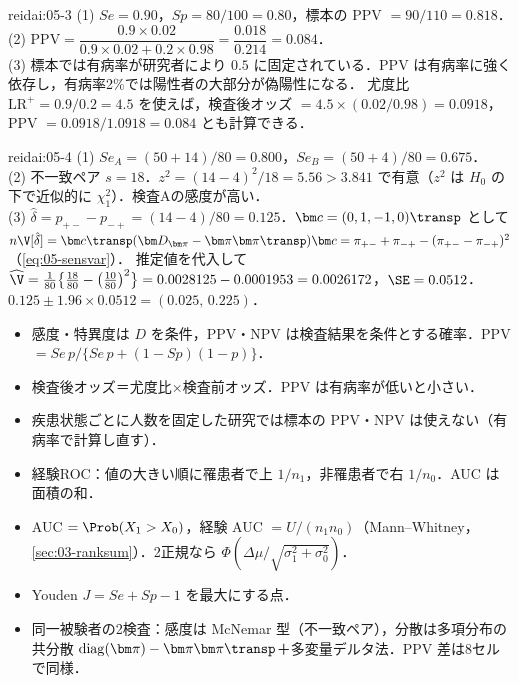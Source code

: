 \begin{kaitou}{reidai:05-3}
(1) $Se=0.90$，$Sp=80/100=0.80$，標本の PPV $=90/110=0.818$．\\
(2) $\mathrm{PPV}=\dfrac{0.9\times0.02}{0.9\times0.02+0.2\times0.98}=\dfrac{0.018}{0.214}=0.084$．\\
(3) 標本では有病率が研究者により $0.5$ に固定されている．PPV は有病率に強く依存し，有病率2\%では陽性者の大部分が偽陽性になる．
尤度比 $\mathrm{LR}^+=0.9/0.2=4.5$ を使えば，検査後オッズ $=4.5\times(0.02/0.98)=0.0918$，PPV $=0.0918/1.0918=0.084$ とも計算できる．
\end{kaitou}

\begin{kaitou}{reidai:05-4}
(1) $Se_A=(50+14)/80=0.800$，$Se_B=(50+4)/80=0.675$．\\
(2) 不一致ペア $s=18$．$z^2=(14-4)^2/18=5.56>3.841$ で有意（$z^2$ は $H_0$ の下で近似的に $\chi^2_1$）．検査Aの感度が高い．\\
(3) $\hat\delta=p_{+-}-p_{-+}=(14-4)/80=0.125$．$\bm c=(0,1,-1,0)\transp$ として
$n\V[\hat\delta]=\bm c\transp(\bm D_{\bm\pi}-\bm\pi\bm\pi\transp)\bm c=\pi_{+-}+\pi_{-+}-(\pi_{+-}-\pi_{-+})^2$（\cref{eq:05-sensvar}）．
推定値を代入して $\widehat\V=\frac{1}{80}\bigl\{\frac{18}{80}-\bigl(\frac{10}{80}\bigr)^2\bigr\}=0.0028125-0.0001953=0.0026172$，$\SE=0.0512$．
$0.125\pm1.96\times0.0512=(0.025,\,0.225)$．
\end{kaitou}

\begin{summarybox}
\begin{itemize}
\item 感度・特異度は $D$ を条件，PPV・NPV は検査結果を条件とする確率．PPV $=Se\,p/\{Se\,p+(1-Sp)(1-p)\}$．
\item 検査後オッズ＝尤度比×検査前オッズ．PPV は有病率が低いと小さい．
\item 疾患状態ごとに人数を固定した研究では標本の PPV・NPV は使えない（有病率で計算し直す）．
\item 経験ROC：値の大きい順に罹患者で上 $1/n_1$，非罹患者で右 $1/n_0$．AUC は面積の和．
\item AUC $=\Prob(X_1>X_0)$，経験 AUC $=U/(n_1n_0)$（Mann--Whitney，\cref{sec:03-ranksum}）．2正規なら $\Phi(\Delta\mu/\sqrt{\sigma_1^2+\sigma_0^2})$．
\item Youden $J=Se+Sp-1$ を最大にする点．
\item 同一被験者の2検査：感度は McNemar 型（不一致ペア），分散は多項分布の共分散 $\mathrm{diag}(\bm\pi)-\bm\pi\bm\pi\transp$＋多変量デルタ法．PPV 差は8セルで同様．
\end{itemize}
\end{summarybox}
